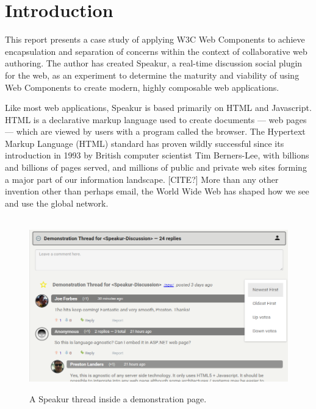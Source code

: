 \chapter{Introduction}
%

%
%

This report presents a case study of applying W3C Web Components 
to achieve encapsulation and separation of concerns within the context of collaborative web authoring. 
The author has created Speakur, a real-time discussion social plugin for the web, 
as an experiment to determine the maturity and viability of using Web Components to create modern, highly composable web applications.

Like most web applications, Speakur is based primarily on HTML and Java\-script. 
HTML is a declarative markup language used to create documents --- web pages --- which are viewed by users with a program called the browser. 
The Hypertext Markup Language (HTML) 
standard has proven wildly successful since its introduction in 1993 by British computer scientist 
Tim Berners-Lee, 
with billions and billions of pages served, 
and millions of public and private web sites forming a major part of our information landscape. [CITE?]
More than any other invention other than perhaps email, the World Wide Web has shaped how we see and use the global network.

% 
\begin{figure}[htb]
\begin{center}
\ \includegraphics[width=6in]{images/screenshot_20150312_1630_v2.png}
\caption{A Speakur thread inside a demonstration page.}
\label{f:ex}
\end{center}
\end{figure}
%

